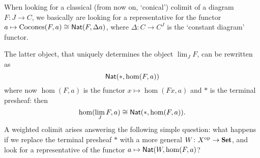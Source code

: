 When looking for a classical (from now on, `conical') colimit of a diagram $F\colon J \to C$, we basically are looking for a representative for the functor $a\mapsto \text{Cocones}(F,a)\cong \textsf{Nat}(F,\Delta a)$, where $\Delta : C \to C^J$ is the `constant diagram' functor.

The latter object, that uniquely determines the object $\lim_J F$, can be rewritten as
\[
\textsf{Nat}(*, \hom(F,a))
\]
where now $\hom(F,a)$ is the functor $x\mapsto \hom(Fx,a)$ and $*$ is the terminal presheaf: then
\[
\hom(\lim_J F,a)\cong \textsf{Nat}(*, \hom(F,a)).
\]
A weighted colimit arises answering the following simple question: what happens if we replace the terminal presheaf $*$ with a more general $W\colon X^\opp\to \Sets$, and look for a representative of the functor $a\mapsto \textsf{Nat}(W, \hom(F,a)$? 

\begin{definition}

\end{definition}
\begin{remark}\label{all-are}

\end{remark}